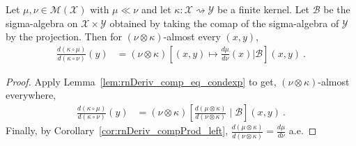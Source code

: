 \begin{lemma}
  \label{lem:rnDeriv_comp_eq_condexp_right}
  \uses{}
  Let $\mu, \nu \in \mathcal M(\mathcal X)$ with $\mu \ll \nu$ and let $\kappa : \mathcal X \rightsquigarrow \mathcal Y$ be a finite kernel.
  Let $\mathcal B$ be the sigma-algebra on $\mathcal X \times \mathcal Y$ obtained by taking the comap of the sigma-algebra of $\mathcal Y$ by the projection.
  Then for $(\nu \otimes \kappa)$-almost every $(x,y)$,
  \begin{align*}
  \frac{d(\kappa \circ \mu)}{d(\kappa \circ \nu)}(y)
  &= (\nu \otimes \kappa)\left[ (x, y) \mapsto \frac{d \mu}{d \nu}(x) \Big| \mathcal B \right](x,y)
  \: .
  \end{align*}
  
\end{lemma}

\begin{proof}%
{}
Apply Lemma~\ref{lem:rnDeriv_comp_eq_condexp} to get, $(\nu \otimes \kappa)$-almost everywhere,
\begin{align*}
\frac{d(\kappa \circ \mu)}{d(\kappa \circ \nu)}(y)
&= (\nu \otimes \kappa)\left[ \frac{d (\mu \otimes \kappa)}{d (\nu \otimes \kappa)} \mid \mathcal B\right](x,y)
\: .
\end{align*}
Finally, by Corollary~\ref{cor:rnDeriv_compProd_left}, $\frac{d (\mu \otimes \kappa)}{d (\nu \otimes \kappa)} = \frac{d \mu}{d \nu}$ a.e.
\end{proof}